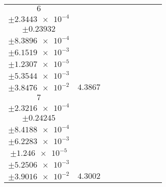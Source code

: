 \documentclass[8pt]{article}
\begin{document}
\begin{longtable}[l]{c c c c c c c c c}
$\num{6}$ & \begin{tabular}[c]{@{}c@{}}$\num{5.6284e-2}$ \\ $\pm\num{2.3443e-4}$\end{tabular} & \begin{tabular}[c]{@{}c@{}}$\num{-0.5606}$ \\ $\pm\num{0.23932}$\end{tabular} & \begin{tabular}[c]{@{}c@{}}$\num{-3.4147}$ \\ $\pm\num{8.3896e-4}$\end{tabular} & \begin{tabular}[c]{@{}c@{}}$\num{2.0711e+3}$ \\ $\pm\num{6.1519e-3}$\end{tabular} & \begin{tabular}[c]{@{}c@{}}$\num{4.1434}$ \\ $\pm\num{1.2307e-5}$\end{tabular} & \begin{tabular}[c]{@{}c@{}}$\num{1.2006}$ \\ $\pm\num{5.3544e-3}$\end{tabular} & \begin{tabular}[c]{@{}c@{}}$\num{4.1827}$ \\ $\pm\num{3.8476e-2}$\end{tabular} & $\num{4.3867}$\\
$\num{7}$ & \begin{tabular}[c]{@{}c@{}}$\num{5.5014e-2}$ \\ $\pm\num{2.3216e-4}$\end{tabular} & \begin{tabular}[c]{@{}c@{}}$\num{-0.50176}$ \\ $\pm\num{0.24245}$\end{tabular} & \begin{tabular}[c]{@{}c@{}}$\num{3.4163}$ \\ $\pm\num{8.4188e-4}$\end{tabular} & \begin{tabular}[c]{@{}c@{}}$\num{2.078e+3}$ \\ $\pm\num{6.2283e-3}$\end{tabular} & \begin{tabular}[c]{@{}c@{}}$\num{4.1571}$ \\ $\pm\num{1.246e-5}$\end{tabular} & \begin{tabular}[c]{@{}c@{}}$\num{1.1712}$ \\ $\pm\num{5.2506e-3}$\end{tabular} & \begin{tabular}[c]{@{}c@{}}$\num{4.1994}$ \\ $\pm\num{3.9016e-2}$\end{tabular} & $\num{4.3002}$\\

\end{longtable}
\end{document}

